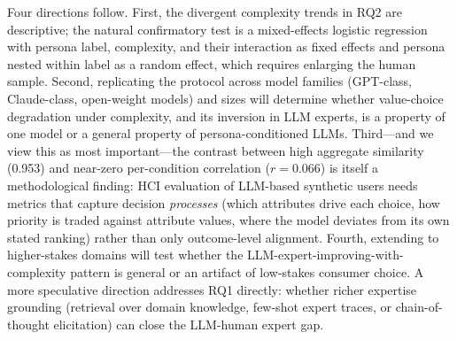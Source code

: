 \documentclass[manuscript,review]{acmart}
\begin{document}
Four directions follow. First, the divergent complexity trends in RQ2 are descriptive; the natural confirmatory test is a mixed-effects logistic regression with persona label, complexity, and their interaction as fixed effects and persona nested within label as a random effect, which requires enlarging the human sample. Second, replicating the protocol across model families (GPT-class, Claude-class, open-weight models) and sizes will determine whether value-choice degradation under complexity, and its inversion in LLM experts, is a property of one model or a general property of persona-conditioned LLMs. Third---and we view this as most important---the contrast between high aggregate similarity (0.953) and near-zero per-condition correlation ($r = 0.066$) is itself a methodological finding: HCI evaluation of LLM-based synthetic users needs metrics that capture decision \emph{processes} (which attributes drive each choice, how priority is traded against attribute values, where the model deviates from its own stated ranking) rather than only outcome-level alignment. Fourth, extending to higher-stakes domains will test whether the LLM-expert-improving-with-complexity pattern is general or an artifact of low-stakes consumer choice. A more speculative direction addresses RQ1 directly: whether richer expertise grounding (retrieval over domain knowledge, few-shot expert traces, or chain-of-thought elicitation) can close the LLM-human expert gap.
\end{document}
